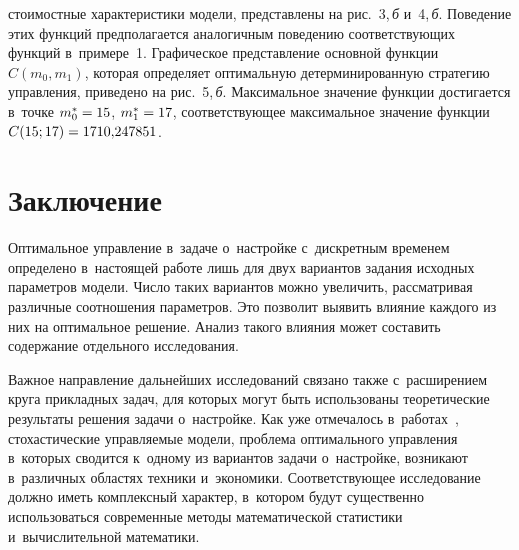 \begin{multicols}{2}

\noindent
 стоимостные характеристики модели, пред\-став\-ле\-ны на рис.~3,\,\textit{б} 
и~4,\,\textit{б}. Поведение этих функций
 предполагается аналогичным поведению со\-от\-вет\-ст\-ву\-ющих 
функций в~примере~1.
Графическое представление основной функции $C(m_0, m_1)$, которая определяет 
оптимальную детерминированную стратегию управ\-ле\-ния, приведено на рис.~5,\,\textit{б}. 
Максимальное значение функции достигается в~точке $m_0^*\hm=15$, $m_1^*\hm=17$, 
соответствующее максимальное значение функции $C(15;17)\hm = 1710{,}247851$.








 


\vspace*{-12pt}

\section{Заключение}

\vspace*{-4pt}

Оптимальное управление в~задаче о~настройке с~дискретным временем определено 
в~настоящей работе лишь для двух вариантов задания исходных па\-ра\-мет\-ров модели. 
Число таких вариантов можно увеличить, рас\-смат\-ри\-вая различные соотношения 
параметров. Это позволит выявить влияние каж\-до\-го из них на оптимальное решение. 
Анализ такого влияния может со\-ста\-вить содержание отдельного исследования.

Важное направление дальнейших исследований связано так\-же с~расширением круга 
при\-клад\-ных задач, для которых могут быть использованы тео\-ре\-ти\-че\-ские результаты 
решения задачи о~настройке. Как уже отмечалось в~работах~\cite{A1, A4, A5}, 
стохастические управ\-ля\-емые модели, проблема оптимального управления в~которых 
сводится к~одному из вариантов задачи о~настройке, возникают в~различных 
областях техники и~экономики. Со\-от\-вет\-ст\-ву\-ющее исследование должно иметь 
комплексный характер, в~котором будут существенно использоваться современные 
методы математической ста\-ти\-сти\-ки и~вы\-чис\-ли\-тель\-ной математики.


\end{multicols}
